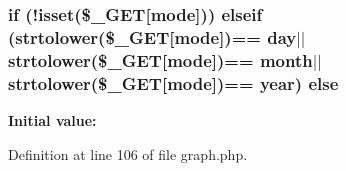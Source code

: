 \subsubsection[{else}]{\setlength{\rightskip}{0pt plus 5cm}if (!isset(\$\+\_\+\+G\+ET[\textquotesingle{}mode\textquotesingle{}])) elseif (strtolower(\$\+\_\+\+G\+ET[\textquotesingle{}mode\textquotesingle{}])== \textquotesingle{}day\textquotesingle{}$\vert$$\vert$strtolower(\$\+\_\+\+G\+ET[\textquotesingle{}mode\textquotesingle{}])== \textquotesingle{}month\textquotesingle{}$\vert$$\vert$strtolower(\$\+\_\+\+G\+ET[\textquotesingle{}mode\textquotesingle{}])== \textquotesingle{}year\textquotesingle{}) else}\label{graph_8php_aa98e5745136db21835880938c0eba666}
{\bfseries Initial value\+:}


Definition at line 106 of file graph.\+php.

